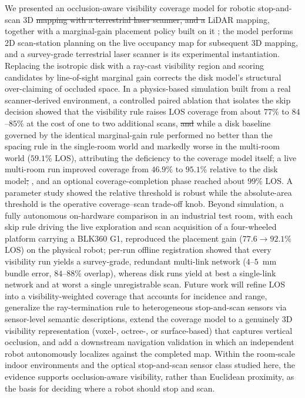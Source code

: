 \documentclass[sensors,article,submit,pdftex,moreauthors]{Definitions/mdpi}
\providecommand{\DIFadd}[1]{{\protect\color{blue} \sf #1}} %
\providecommand{\DIFdel}[1]{{\protect\color{red}\protect\scriptsize\protect\sout{#1}}} %
\providecommand{\DIFaddbegin}{} %
\providecommand{\DIFaddend}{} %
\providecommand{\DIFdelbegin}{} %
\providecommand{\DIFdelend}{} %
\begin{document}
We presented an occlusion-aware visibility coverage model for \DIFaddbegin \DIFadd{robotic
}\DIFaddend stop-and-scan 3D \DIFdelbegin \DIFdel{mapping with a terrestrial laser scanner, and a }\DIFdelend \DIFaddbegin \DIFadd{LiDAR mapping, together with a }\DIFaddend marginal-gain placement policy
built on it\DIFaddbegin \DIFadd{; the model performs 2D scan-station planning on the live occupancy
map for subsequent 3D mapping, and a survey-grade terrestrial laser scanner is
its experimental instantiation}\DIFaddend . Replacing the isotropic disk with a ray-cast
visibility region and scoring candidates by line-of-sight marginal gain
corrects the disk model's structural over-claiming of occluded space. In a physics-based simulation built
from a real scanner-derived environment, a controlled paired ablation that
isolates the skip decision showed that the visibility rule raises LOS coverage
from about $77\%$ to $84$--$85\%$ at the cost of one to two additional scans,
\DIFdelbegin \DIFdel{and
}\DIFdelend \DIFaddbegin \DIFadd{while a disk baseline governed by the identical marginal-gain rule performed no
better than the spacing rule in the single-room world and markedly worse in the
multi-room world ($59.1\%$ LOS), attributing the deficiency to the coverage
model itself; }\DIFaddend a live multi-room run improved coverage from $46.9\%$ to
$95.1\%$ relative to the disk model\DIFdelbegin \DIFdel{; }\DIFdelend \DIFaddbegin \DIFadd{, and }\DIFaddend an optional coverage-completion phase
reached about $99\%$ LOS. A
parameter study showed the relative threshold is robust while the absolute-area
threshold is the operative coverage--scan trade-off knob. Beyond simulation, a fully
autonomous on-hardware comparison in an industrial test room, with each skip
rule driving the live exploration and scan acquisition of a four-wheeled
platform carrying a BLK360 G1, reproduced the placement gain
($77.6\to92.1\%$ LOS) on the physical robot; per-run offline registration showed
that every visibility run yields a survey-grade, redundant multi-link network
($4$--$5$~mm bundle error, $84$--$88\%$ overlap), whereas disk runs yield at
best a single-link network and at worst a single unregistrable scan. Future work will
refine LOS into a visibility-weighted coverage that accounts for incidence and
range, generalize the ray-termination rule to heterogeneous stop-and-scan sensors
via sensor-level semantic descriptions, \DIFaddbegin \DIFadd{extend the coverage model to a
genuinely 3D visibility representation (voxel-, octree-, or surface-based)
that captures vertical occlusion, }\DIFaddend and add a downstream navigation validation
in which an independent robot autonomously localizes against the completed
map. \DIFaddbegin \DIFadd{Within the room-scale indoor environments and the optical stop-and-scan
sensor class studied here, the evidence supports occlusion-aware visibility,
rather than Euclidean proximity, as the basis for deciding where a robot
should stop and scan.
}\DIFaddend 
\end{document}
